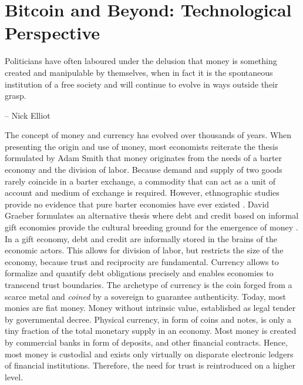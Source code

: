 \chapter{Bitcoin and Beyond: Technological Perspective}
\label{sec:crypto}

\epigraph{Politicians have often laboured under the delusion that money is something created and manipulable by themselves, when in fact it is the spontaneous institution of a free society and will continue to evolve in ways outside their grasp.}{-- \textup{Nick Elliot}}

The concept of money and currency has evolved over thousands of years. When presenting the origin and use of money, most economists reiterate the thesis formulated by Adam Smith that money originates from the needs of a barter economy and the division of labor. Because demand and supply of two goods rarely coincide in a barter exchange, a commodity that can act as a unit of account and medium of exchange is required. However, ethnographic studies provide no evidence that pure barter economies have ever existed \parencite{graeber2014debt}. David Graeber formulates an alternative thesis where debt and credit based on informal gift economies provide the cultural breeding ground for the emergence of money \parencite{graeber2014debt}. 
In a gift economy, debt and credit are informally stored in the brains of the economic actors. This allows for division of labor, but restricts the size of the economy, because trust and reciprocity are fundamental. Currency allows to formalize and quantify debt obligations precisely and enables economies to transcend trust boundaries. The archetype of currency is the coin forged from a scarce metal and \emph{coined} by a sovereign to guarantee authenticity. Today, most monies are fiat money. Money without intrinsic value, established as legal tender by governmental decree. Physical currency, in form of coins and notes, is only a tiny fraction of the total monetary supply in an economy. Most money is created by commercial banks in form of deposits, and other financial contracts. Hence, most money is custodial and exists only virtually on disparate electronic ledgers of financial institutions. Therefore, the need for trust is reintroduced on a higher level.

